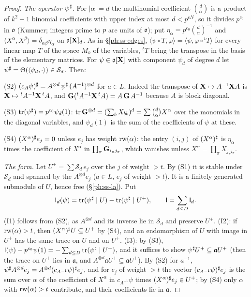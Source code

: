 \documentclass[10pt]{amsart}
\theoremstyle{definition}
\theoremstyle{remark}
\providecommand{\pao}{\mathfrak o}
\begin{document}
\begin{proof}
\emph{The operator $\psi^\sharp$.} For $|\alpha|=d$ the multinomial coefficient $\binom d\alpha$ is
a product of $k^2-1$ binomial coefficients with upper index at most $d<p^{eN}$, so it divides
$p^{c_0}$ in $\pao$ (Kummer; integers prime to $p$ are units of $\pao$); put $\eta_\alpha=p^{c_0}
\binom d\alpha^{-1}$ and $\langle X^\alpha,X^\beta\rangle=\delta_{\alpha\beta}\eta_\alpha$ on
$\pao[\peX]_d$. As in \S\ref{ph:ss-edges}, $\langle\psi\circ T,\varphi\rangle=\langle\psi,\varphi
\circ{}^tT\rangle$ for every linear map $T$ of the space $M_k$ of the variables, ${}^tT$ being the
transpose in the basis of the elementary matrices. For $\psi\in\pao[\peX]$ with component $\psi_d$
of degree $d$ let $\psi^\sharp=\Theta(\langle\psi_d,\cdot\rangle)\in\mathcal S_d$. Then:

{\rm(S2)} $(c_A\psi)^\sharp=A^{\otimes d}\,\psi^\sharp\,(A^{-1})^{\otimes d}$ for $a\in L$. Indeed the
transpose of $\mathbf X\mapsto A^{-1}\mathbf X A$ is $\mathbf X\mapsto{}^tA^{-1}\mathbf X\,{}^tA$, and $\mathbf G({}^tA^{-1}
\mathbf X\,{}^tA)=A\,\mathbf G\,A^{-1}$ because $A$ is block diagonal.

{\rm(S3)} $\operatorname{tr}(\psi^\sharp)=p^{c_0}\psi_d(1)$: $\operatorname{tr}\mathbf G^{\otimes d}=(\sum_bX_{bb})^d=\sum\binom
d\alpha X^\alpha$ over the monomials in the diagonal variables, and $\psi_d(1)$ is the sum of the
coefficients of $\psi$ at these.

{\rm(S4)} $(X^\alpha)^\sharp e_j=0$ unless $e_j$ has weight $\operatorname{rw}(\alpha)$: the entry $(i,j)$ of
$(X^\alpha)^\sharp$ is $\eta_\alpha$ times the coefficient of $X^\alpha$ in $\prod_\pi\mathbf G_{i_\pi j_\pi}$,
which vanishes unless $X^\alpha=\prod_\pi X_{j_\pi i_\pi}$.

\emph{The form.} Let $U^+=\sum\mathcal S_d\,e_j$ over the $j$ of weight $>t$. By (S1) it is stable
under $\mathcal S_d$ and spanned by the $A^{\otimes d}e_j$ ($a\in L$, $e_j$ of weight $>t$). It is
a finitely generated submodule of $U$, hence free (\S\ref{ph:ss-la}). Put
\[
\mathsf I_d(\psi)=\operatorname{tr}(\psi^\sharp\mid U)-\operatorname{tr}(\psi^\sharp\mid U^+),\qquad\mathsf I=\sum_{d\le
D}\mathsf I_d .
\]
(I1) follows from (S2), as $A^{\otimes d}$ and its inverse lie in $\mathcal S_d$ and preserve
$U^+$. (I2): if $\operatorname{rw}(\alpha)>t$, then $(X^\alpha)^\sharp U\subseteq U^+$ by (S4), and an
endomorphism of $U$ with image in $U^+$ has the same trace on $U$ and on $U^+$. (I3): by (S3),
$\mathsf I(\psi)-p^{c_0}\psi(1)=-\sum_{d\le D}\operatorname{tr}(\psi^\sharp\mid U^+)$, and it suffices to show
$\psi^\sharp U^+\subseteq\mathfrak aU^+$ (then the trace on $U^+$ lies in $\mathfrak a$, and $A^{\otimes d}\mathfrak aU^+\subseteq\mathfrak aU^+$). By (S2) for $a^{-1}$, $\psi^\sharp A^{\otimes d}e_j=A^{\otimes d}
(c_{A^{-1}}\psi)^\sharp e_j$, and for $e_j$ of weight $>t$ the vector $(c_{A^{-1}}\psi)^\sharp e_j$ is
the sum over $\alpha$ of the coefficient of $X^\alpha$ in $c_{A^{-1}}\psi$ times $(X^\alpha)^\sharp
e_j\in U^+$; by (S4) only $\alpha$ with $\operatorname{rw}(\alpha)>t$ contribute, and their coefficients lie in
$\mathfrak a$.
\end{proof}
\end{document}
